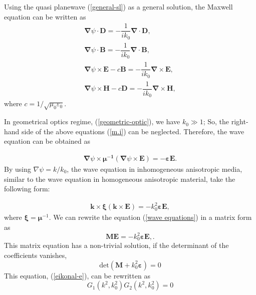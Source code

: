 \documentclass[9pt,twocolumn,twoside]{osajnl}
\begin{document}
Using the quasi planewave (\ref{general-sl}) as a general solution, the Maxwell equation can be written as 
\begin{gather}
\boldsymbol{\nabla}{\psi}\cdot\mathbf{D}=-\dfrac{1}{ik_{0}}\boldsymbol{\nabla}\cdot \mathbf{D}, \nonumber\\
\boldsymbol{\nabla}{\psi}\cdot \mathbf{B}=-\dfrac{1}{ik_{0}}\boldsymbol{\nabla}\cdot \mathbf{B},\nonumber\\
\boldsymbol{\nabla}{\psi}\times\mathbf{E}-c\mathbf{B}=-\dfrac{1}{ik_{0}} \boldsymbol{\nabla}\times\mathbf{E},\nonumber\\
\boldsymbol{\nabla}{\psi}\times\mathbf{H}-c\mathbf{D}=-\dfrac{1}{ik_{0}} \boldsymbol{\nabla}\times\mathbf{H},\label{m.i}
\end{gather}
where $c={1}/{\sqrt{\mu_{0}\varepsilon_{0}}}$.

In geometrical optics regime, (\ref{geometric-optic}), we have $k_{0}\gg1$; So, the right-hand side of the above equations (\ref{m.i}) can be neglected.  Therefore, the wave equation can be obtained as 

\begin{eqnarray}
\boldsymbol{\nabla}{\psi}\times{\boldsymbol{\mu^{-1}}(\boldsymbol{\nabla}{\psi}\times\mathbf{E})}=-\boldsymbol{\varepsilon}\mathbf{E}.
\end{eqnarray}
By using $\nabla{\psi}=k/k_{0}$, the wave equation in inhomogeneous anisotropic media, similar to  the wave equation in homogeneous anisotropic material, take the following form: 

\begin{eqnarray}\label{wave equations}
\mathbf{k} \times{\boldsymbol{\xi}(\mathbf{k}\times\mathbf{E})}=-k^{2}_{0}\boldsymbol{\varepsilon}\mathbf{E},
\end{eqnarray}
where $\boldsymbol{\xi}=\boldsymbol{\mu}^{-1}$. 
We can rewrite the equation (\ref{wave equations}) in a matrix form as
\begin{equation}\label{matrix form}
\mathbf{M}\mathbf{E}=-k_{0}^{2}\boldsymbol{\varepsilon}\mathbf{E}, . 
\end{equation}
This matrix equation has a non-trivial solution, if the determinant of the coefficients vanishes,
\begin{equation}\label{eikonal-e}
\mathrm{det}(\mathbf{M}+k_{0}^{2}\boldsymbol{\varepsilon})=0
\end{equation}
This equation, (\ref{eikonal-e}), can be rewritten as
\begin{equation}\label{eikonal-eq}
G_{1}(k^2,k^2_{0})G_{2}(k^2,k^2_{0})=0
\end{equation}
\end{document}

